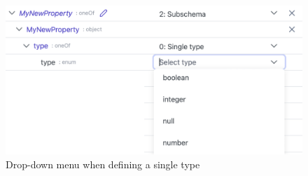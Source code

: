 \begin{figure}[!t]
    \centering
    \includegraphics[width=\columnwidth]{figures/schema_editor_choose_type}
    \caption{Drop-down menu when defining a single type}
    \label{fig:schema_editor_choose_type}
\end{figure}


